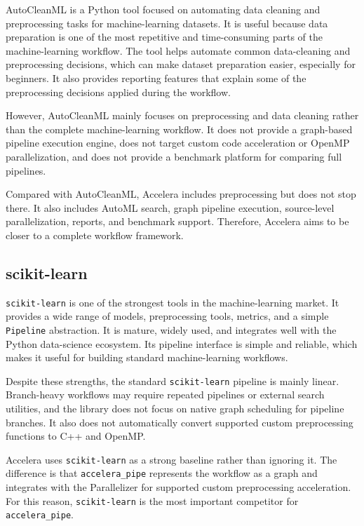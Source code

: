 \documentclass[12pt,a4paper]{report}
\begin{document}
AutoCleanML is a Python tool focused on automating data cleaning and
preprocessing tasks for machine-learning datasets. It is useful because data
preparation is one of the most repetitive and time-consuming parts of the
machine-learning workflow. The tool helps automate common data-cleaning and
preprocessing decisions, which can make dataset preparation easier, especially
for beginners. It also provides reporting features that explain some of the
preprocessing decisions applied during the workflow.

\medskip
\noindent However, AutoCleanML mainly focuses on preprocessing and data cleaning rather
than the complete machine-learning workflow. It does not provide a graph-based
pipeline execution engine, does not target custom code acceleration or OpenMP
parallelization, and does not provide a benchmark platform for comparing full
pipelines.

\medskip
\noindent Compared with AutoCleanML, Accelera includes preprocessing but does not stop
there. It also includes AutoML search, graph pipeline execution, source-level
parallelization, reports, and benchmark support. Therefore, Accelera aims to be
closer to a complete workflow framework.


\subsection{scikit-learn}

\texttt{scikit-learn} is one of the strongest tools in the machine-learning
market. It provides a wide range of models, preprocessing tools, metrics, and a
simple \texttt{Pipeline} abstraction. It is mature, widely used, and integrates
well with the Python data-science ecosystem. Its pipeline interface is simple
and reliable, which makes it useful for building standard machine-learning
workflows.

\medskip
\noindent Despite these strengths, the standard \texttt{scikit-learn} pipeline is mainly
linear. Branch-heavy workflows may require repeated pipelines or external search
utilities, and the library does not focus on native graph scheduling for
pipeline branches. It also does not automatically convert supported custom
preprocessing functions to C++ and OpenMP.

\medskip
\noindent Accelera uses \texttt{scikit-learn} as a strong baseline rather than ignoring
it. The difference is that \texttt{accelera\_pipe} represents the workflow as a
graph and integrates with the Parallelizer for supported custom preprocessing
acceleration. For this reason, \texttt{scikit-learn} is the most important
competitor for \texttt{accelera\_pipe}.
\end{document}

